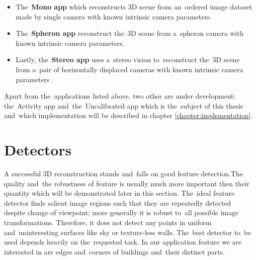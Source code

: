 \begin{itemize}
	\item The~\textbf{Mono app} which reconstructs 3D scene from an~ordered image dataset made by single camera with known intrinsic camera parameters.
	
	\item The~\textbf{Spheron app} reconstruct the~3D scene from a~spheron camera with known intrinsic camera parameters.
	
	\item Lastly, the~\textbf{Stereo app} uses a~stereo vision to~reconstruct the~3D scene from a~pair of horizontally displaced cameras with known intrinsic camera parameters .
\end{itemize}

Apart from the~applications listed above, two other are under development: the~Activity app and~the~Uncalibrated app which is the~subject of this thesis and~which implementation will be described in chapter \ref{chapter:implementation}.

\section{Detectors}
\label{sec:detectors}
A successful 3D reconstruction stands and~falls on good feature detection.The quality and~the robustness of feature is usually much more important then their quantity which will be demonstrated later in this section. The~ideal feature detector finds salient image regions such that they are repeatedly detected despite change of viewpoint; more generally it is robust to~all possible image transformations. Therefore, it does not detect any points in uniform and~uninteresting surfaces like sky or texture-less walls. The~best detector to~be used depends heavily on the~requested task. In our application feature we are interested in are edges and~corners of buildings and~their distinct parts.

